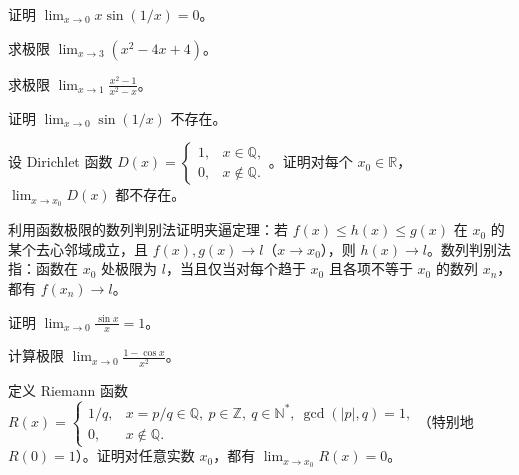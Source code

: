 \newpage
\noindent\begin{minipage}{\textwidth}
证明 $\lim_{x\to0}x\sin(1/x)=0$。
\end{minipage}\par\vfill
\noindent\begin{minipage}{\textwidth}
求极限 $\lim_{x\to3}(x^2-4x+4)$。
\end{minipage}\par\vfill
\noindent\begin{minipage}{\textwidth}
求极限 $\lim_{x\to1}\frac{x^2-1}{x^2-x}$。
\end{minipage}\par\vfill
\newpage
\noindent\begin{minipage}{\textwidth}
证明 $\lim_{x\to0}\sin(1/x)$ 不存在。
\end{minipage}\par\vfill
\noindent\begin{minipage}{\textwidth}
设 Dirichlet 函数 $D(x)=\begin{cases}1,&x\in\mathbb Q,\\0,&x\notin\mathbb Q.\end{cases}$。证明对每个 $x_0\in\mathbb R$，$\lim_{x\to x_0}D(x)$ 都不存在。
\end{minipage}\par\vfill
\noindent\begin{minipage}{\textwidth}
利用函数极限的数列判别法证明夹逼定理：若 $f(x)\le h(x)\le g(x)$ 在 $x_0$ 的某个去心邻域成立，且 $f(x),g(x)\to l$（$x\to x_0$），则 $h(x)\to l$。数列判别法指：函数在 $x_0$ 处极限为 $l$，当且仅当对每个趋于 $x_0$ 且各项不等于 $x_0$ 的数列 $x_n$，都有 $f(x_n)\to l$。
\end{minipage}\par\vfill
\newpage
\noindent\begin{minipage}{\textwidth}
证明 $\lim_{x\to0}\frac{\sin x}{x}=1$。
\end{minipage}\par\vfill
\noindent\begin{minipage}{\textwidth}
计算极限 $\lim_{x\to0}\frac{1-\cos x}{x^2}$。
\end{minipage}\par\vfill
\noindent\begin{minipage}{\textwidth}
定义 Riemann 函数 $R(x)=\begin{cases}1/q,&x=p/q\in\mathbb Q,\ p\in\mathbb Z,\ q\in\mathbb N^*,\ \gcd(|p|,q)=1,\\0,&x\notin\mathbb Q.\end{cases}$（特别地 $R(0)=1$）。证明对任意实数 $x_0$，都有 $\lim_{x\to x_0}R(x)=0$。
\end{minipage}\par\vfill
